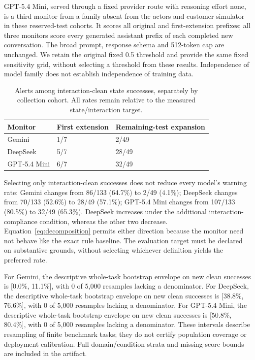 GPT-5.4 Mini, served through a fixed provider route with reasoning effort none, is a third monitor from a family absent from the actors and customer simulator in these reserved-test cohorts. It scores all original and first-extension prefixes; all three monitors score every generated assistant prefix of each completed new conversation. The broad prompt, response schema and 512-token cap are unchanged. We retain the original fixed 0.5 threshold and provide the same fixed sensitivity grid, without selecting a threshold from these results. Independence of model family does not establish independence of training data.

\begin{table}[t]\centering\small
\caption{Alerts among interaction-clean state successes, separately by collection cohort.  All rates remain relative to the measured state/interaction target.}\label{tab:expanded-monitors}
\begin{tabular}{lll}
\toprule
Monitor & First extension & Remaining-test expansion\\
\midrule
Gemini & 1/7 & 2/49\\
DeepSeek & 5/7 & 28/49\\
GPT-5.4 Mini & 6/7 & 32/49\\
\bottomrule
\end{tabular}
\end{table}
Selecting only interaction-clean successes does not reduce every model's warning rate: Gemini changes from 86/133 (64.7\%) to 2/49 (4.1\%); DeepSeek changes from 70/133 (52.6\%) to 28/49 (57.1\%); GPT-5.4 Mini changes from 107/133 (80.5\%) to 32/49 (65.3\%). DeepSeek increases under the additional interaction-compliance condition, whereas the other two decrease. Equation~\ref{eq:decomposition} permits either direction because the monitor need not behave like the exact rule baseline. The evaluation target must be declared on substantive grounds, without selecting whichever definition yields the preferred rate.

For Gemini, the descriptive whole-task bootstrap envelope on new clean successes is [0.0\%, 11.1\%], with 0 of 5,000 resamples lacking a denominator. For DeepSeek, the descriptive whole-task bootstrap envelope on new clean successes is [38.8\%, 76.6\%], with 0 of 5,000 resamples lacking a denominator. For GPT-5.4 Mini, the descriptive whole-task bootstrap envelope on new clean successes is [50.8\%, 80.4\%], with 0 of 5,000 resamples lacking a denominator. These intervals describe resampling of finite benchmark tasks; they do not certify population coverage or deployment calibration. Full domain/condition strata and missing-score bounds are included in the artifact.

